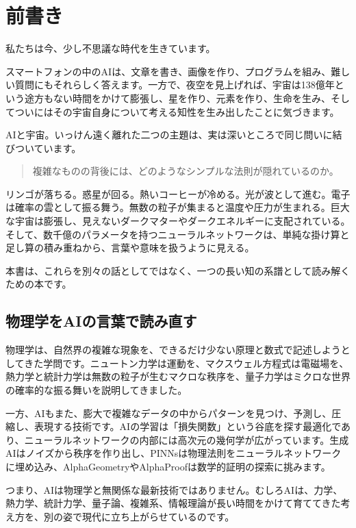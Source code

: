 \chapter*{前書き}

私たちは今、少し不思議な時代を生きています。

スマートフォンの中のAIは、文章を書き、画像を作り、プログラムを組み、難しい質問にもそれらしく答えます。一方で、夜空を見上げれば、宇宙は138億年という途方もない時間をかけて膨張し、星を作り、元素を作り、生命を生み、そしてついにはその宇宙自身について考える知性を生み出したことに気づきます。

AIと宇宙。いっけん遠く離れた二つの主題は、実は深いところで同じ問いに結びついています。

\begin{quote}
複雑なものの背後には、どのようなシンプルな法則が隠れているのか。
\end{quote}

リンゴが落ちる。惑星が回る。熱いコーヒーが冷める。光が波として進む。電子は確率の雲として振る舞う。無数の粒子が集まると温度や圧力が生まれる。巨大な宇宙は膨張し、見えないダークマターやダークエネルギーに支配されている。そして、数千億のパラメータを持つニューラルネットワークは、単純な掛け算と足し算の積み重ねから、言葉や意味を扱うように見える。

本書は、これらを別々の話としてではなく、一つの長い知の系譜として読み解くための本です。

\section*{物理学をAIの言葉で読み直す}

物理学は、自然界の複雑な現象を、できるだけ少ない原理と数式で記述しようとしてきた学問です。ニュートン力学は運動を、マクスウェル方程式は電磁場を、熱力学と統計力学は無数の粒子が生むマクロな秩序を、量子力学はミクロな世界の確率的な振る舞いを説明してきました。

一方、AIもまた、膨大で複雑なデータの中からパターンを見つけ、予測し、圧縮し、表現する技術です。AIの学習は「損失関数」という谷底を探す最適化であり、ニューラルネットワークの内部には高次元の幾何学が広がっています。生成AIはノイズから秩序を作り出し、PINNsは物理法則をニューラルネットワークに埋め込み、AlphaGeometryやAlphaProofは数学的証明の探索に挑みます。

つまり、AIは物理学と無関係な最新技術ではありません。むしろAIは、力学、熱力学、統計力学、量子論、複雑系、情報理論が長い時間をかけて育ててきた考え方を、別の姿で現代に立ち上がらせているのです。

